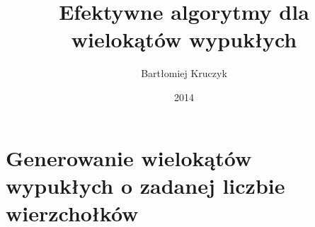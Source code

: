\documentclass[oneside,brudnopis]{xelatex-mgr/xmgr}
\author{Bartłomiej Kruczyk}
\title{Efektywne algorytmy dla wielokątów wypukłych}
\date{2014}
\theoremstyle{definition}
\begin{document}









\summary

\appendix
\chapter{Generowanie wielokątów wypukłych o zadanej liczbie
  wierzchołków}




\listoftables
\listoffigures

\oswiadczenie
\end{document}
